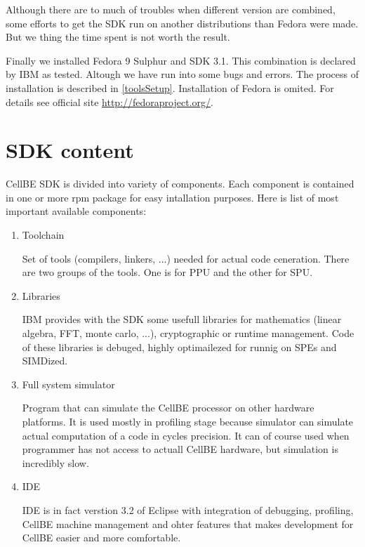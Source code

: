 \par
Although there are to much of troubles when different version are combined, some efforts to get the SDK run on another distributions than Fedora were made.
But we thing the time spent is not worth the result.

\par
Finally we installed Fedora 9 Sulphur and SDK 3.1.
This combination is declared by IBM as tested.
Altough we have run into some bugs and errors.
The process of installation is described in \ref{toolsSetup}.
Installation of Fedora is omited.
For details see official site \url{http://fedoraproject.org/}.

\section {SDK content}

CellBE SDK is divided into variety of components.
Each component is contained in one or more rpm package for easy intallation purposes.
Here is list of most important available components:
\begin{enumerate}
  \item {Toolchain}
  \par
  Set of tools (compilers, linkers, ...) needed for actual code ceneration.
There are two groups of the tools.
One is for PPU and the other for SPU.

  \item {Libraries}
  \par
  IBM provides with the SDK some usefull libraries for mathematics (linear algebra, FFT, monte carlo, ...), cryptographic or runtime management.
Code of these libraries is debuged, highly optimailezed for runnig on SPEs and SIMDized.

  \item {Full system simulator}
  \par
  Program that can simulate the CellBE processor on other hardware platforms.
It is used mostly in profiling stage because simulator can simulate actual computation of a code in cycles precision.
It can of course used when programmer has not access to actuall CellBE hardware, but simulation is incredibly slow.

  \item {IDE}
  \par
  IDE is in fact verstion 3.2 of Eclipse with integration of debugging, profiling, CellBE machine management and ohter features that makes development for CellBE easier and more comfortable.
\end{enumerate}



